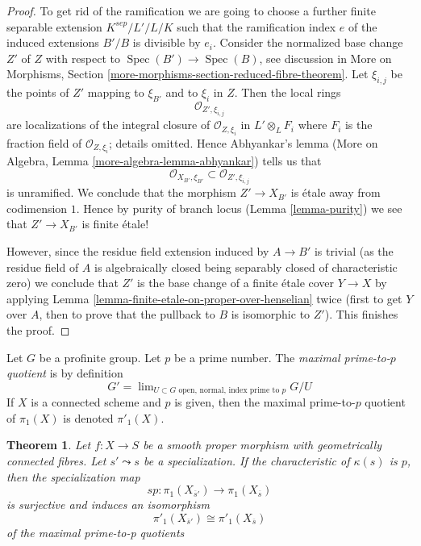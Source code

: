 \documentclass{stacks-project}
\theoremstyle{plain}
\newtheorem{theorem}[subsection]{Theorem}
\theoremstyle{definition}
\theoremstyle{remark}
\numberwithin{equation}{subsection}
\def\lim{\mathop{\mathrm{lim}}\nolimits}
\def\Spec{\mathop{\mathrm{Spec}}}
\begin{document}
\begin{proof}
\medskip\noindent
To get rid of the ramification we are going to choose a further finite
separable extension $K^{sep}/L'/L/K$ such that the ramification
index $e$ of the induced extensions $B'/B$ is divisible by $e_i$.
Consider the normalized base change $Z'$ of $Z$ with respect to
$\Spec(B') \to \Spec(B)$, see discussion in
More on Morphisms, Section \ref{more-morphisms-section-reduced-fibre-theorem}.
Let $\xi_{i, j}$ be the points of $Z'$ mapping to $\xi_{B'}$
and to $\xi_i$ in $Z$. Then the local rings
$$
\mathcal{O}_{Z', \xi_{i, j}}
$$
are localizations of the integral closure of $\mathcal{O}_{Z, \xi_i}$
in $L' \otimes_L F_i$ where $F_i$ is the fraction field of
$\mathcal{O}_{Z, \xi_i}$; details omitted. Hence Abhyankar's lemma
(More on Algebra, Lemma \ref{more-algebra-lemma-abhyankar})
tells us that
$$
\mathcal{O}_{X_{B'}, \xi_{B'}} \subset \mathcal{O}_{Z', \xi_{i, j}}
$$
is unramified. We conclude that the morphism $Z' \to X_{B'}$
is \'etale away from codimension $1$. Hence by purity of
branch locus (Lemma \ref{lemma-purity})
we see that $Z' \to X_{B'}$ is finite \'etale!

\medskip\noindent
However, since the residue field extension induced by $A \to B'$
is trivial (as the residue field of $A$ is algebraically closed
being separably closed of characteristic zero)
we conclude that $Z'$ is the base change of a finite \'etale
cover $Y \to X$ by applying
Lemma \ref{lemma-finite-etale-on-proper-over-henselian}
twice (first to get $Y$ over $A$, then to prove that
the pullback to $B$ is isomorphic to $Z'$).
This finishes the proof.
\end{proof}

\noindent
Let $G$ be a profinite group. Let $p$ be a prime number.
The {\it maximal prime-to-$p$ quotient} is by definition
$$
G' = \lim_{U \subset G\text{ open, normal, index prime to }p} G/U
$$
If $X$ is a connected scheme and $p$ is given, then the maximal
prime-to-$p$ quotient of $\pi_1(X)$ is denoted $\pi'_1(X)$.

\begin{theorem}
\label{theorem-specialization-map-isomorphism-prime-to-p}
Let $f : X \to S$ be a smooth proper morphism with geometrically
connected fibres. Let $s' \leadsto s$ be a specialization.
If the characteristic of $\kappa(s)$ is $p$, then the specialization
map
$$
sp : \pi_1(X_{\overline{s}'}) \to \pi_1(X_{\overline{s}})
$$
is surjective and induces an isomorphism
$$
\pi'_1(X_{\overline{s}'}) \cong \pi'_1(X_{\overline{s}})
$$
of the maximal prime-to-p quotients
\end{theorem}
\end{document}

